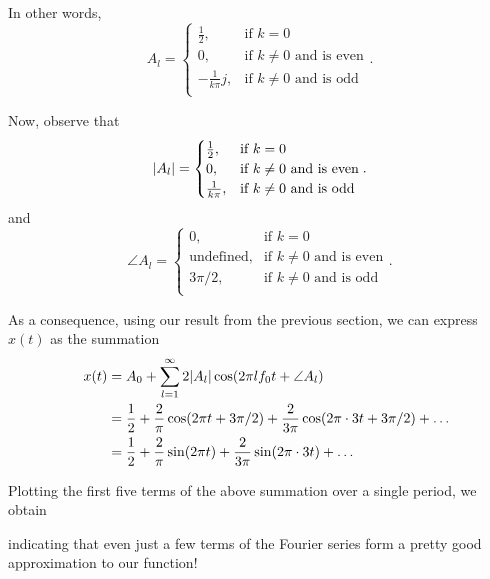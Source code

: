 \documentclass[letterpaper]{article}
\theoremstyle{remark}
\newcommand{\eqn}[1]{\begin{alignat*}{4}#1\end{alignat*}}
\begin{document}
In other words,
\[
A_l = \begin{cases}
     \frac{1}{2}, & \text{if } k = 0 \\
     0, & \text{if } k \ne 0 \text{ and is even} \\
     -\frac{1}{k\pi} j, & \text{if } k \ne 0 \text{ and is odd} \\
    \end{cases}.
\]

Now, observe that
\[
\abs{A_l} = \begin{cases}
     \frac{1}{2}, & \text{if } k = 0 \\
     0, & \text{if } k \ne 0 \text{ and is even} \\
     \frac{1}{k\pi}, & \text{if } k \ne 0 \text{ and is odd} \\
    \end{cases}.
\]
and
\[
\angle{A_l} = \begin{cases}
     0, & \text{if } k = 0 \\
     \text{undefined}, & \text{if } k \ne 0 \text{ and is even} \\
     3\pi/2, & \text{if } k \ne 0 \text{ and is odd} \\
    \end{cases}.
\]

As a consequence, using our result from the previous section, we can express $x(t)$ as the summation
\eqn{
    && x(t) &= A_0 + \sum_{l=1}^\infty 2\abs{A_l} \cos(2\pi lf_0 t + \angle A_l) \\
    &&&= \frac{1}{2} + \frac{2}{\pi} \cos(2\pi t + 3\pi/2) + \frac{2}{3\pi} \cos(2\pi \cdot 3 t + 3\pi/2) + \ldots \\
    &&&= \frac{1}{2} + \frac{2}{\pi} \sin(2\pi t) + \frac{2}{3\pi} \sin(2\pi \cdot 3 t) + \ldots
}

Plotting the first five terms of the above summation over a single period, we obtain
\begin{center}
\end{center}
indicating that even just a few terms of the Fourier series form a pretty good approximation to our function!
\end{document}
